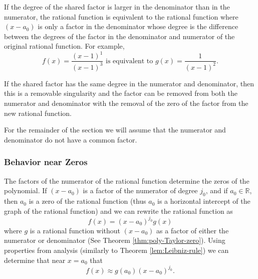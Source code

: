 \documentclass[
]{book}
\theoremstyle{definition}
\theoremstyle{definition}
\theoremstyle{definition}
\theoremstyle{definition}
\theoremstyle{remark}
\begin{document}
If the degree of the shared factor is larger in the denominator than in the numerator, the rational function is equivalent to the rational function where \((x-a_0)\) is only a factor in the denominator whose degree is the difference between the degrees of the factor in the denominator and numerator of the original rational function.
For example,
\[f(x)=\frac{(x-1)^1}{(x-1)^3} \mbox{ is equivalent to } g(x)=\frac{1}{(x-1)^2}.\]

If the shared factor has the same degree in the numerator and denominator, then this is a removable singularity and the factor can be removed from both the numerator and denominator with the removal of the zero of the factor from the new rational function.

For the remainder of the section we will assume that the numerator and denominator do not have a common factor.

\hypertarget{behavior-near-zeros}{%
\subsubsection{Behavior near Zeros}\label{behavior-near-zeros}}

The factors of the numerator of the rational function determine the zeros of the polynomial. If \((x-a_0)\) is a factor of the numerator of degree \(j_0\), and if \(a_0\in \mathbb{R}\), then \(a_0\) is a zero of the rational function (thus \(a_0\) is a horizontal intercept of the graph of the rational function) and we can rewrite the rational function as
\[f(x) = (x-a_0)^{j_0} g(x)\] where \(g\) is a rational function without \((x-a_0)\) as a factor of either the numerator or denominator (See Theorem \ref{thm:poly-Taylor-zero}). Using properties from analysis (similarly to Theorem \ref{lem:Leibniz-rule}) we can determine that near \(x=a_0\) that
\[f(x) \approx g(a_0) (x-a_0)^{j_0}.\]
\end{document}
